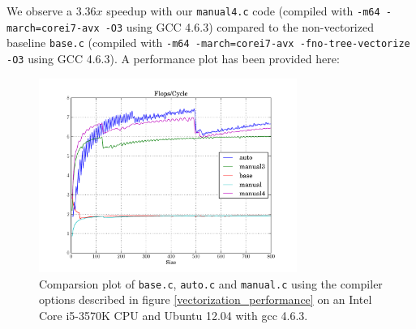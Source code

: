 \documentclass[portrait,a4paper]{article}
\begin{document}
We observe a $3.36x$ speedup with our \lstinline{manual4.c} code (compiled with \texttt{-m64 -march=corei7-avx -O3} using GCC 4.6.3) compared to the non-vectorized baseline \lstinline{base.c} (compiled with \texttt{-m64 -march=corei7-avx -fno-tree-vectorize -O3} using GCC 4.6.3). A performance plot has been provided here: 
\begin{figure}[H]
    \centering
    \includegraphics[width=0.75\textwidth]{vectorization/plot.pdf}
    \caption{Comparsion plot of \lstinline{base.c}, \lstinline{auto.c} and \lstinline{manual.c} using the compiler options described in figure \ref{vectorization_performance} on an Intel Core i5-3570K CPU and Ubuntu 12.04 with gcc 4.6.3.}
\end{figure}
\end{document}
